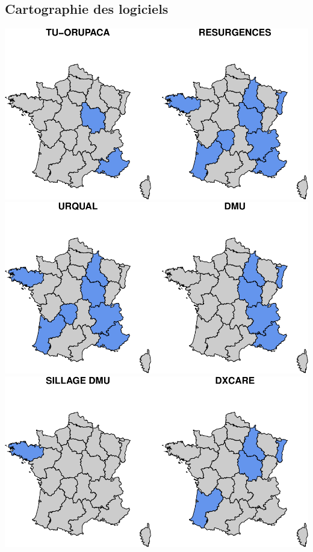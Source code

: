 \documentclass[]{article}
\begin{document}
\subsection{Cartographie des
logiciels}\label{cartographie-des-logiciels}

\includegraphics{septembre2015_files/figure-latex/unnamed-chunk-7-1.pdf}
\includegraphics{septembre2015_files/figure-latex/unnamed-chunk-7-2.pdf}
\includegraphics{septembre2015_files/figure-latex/unnamed-chunk-7-3.pdf}
\end{document}
